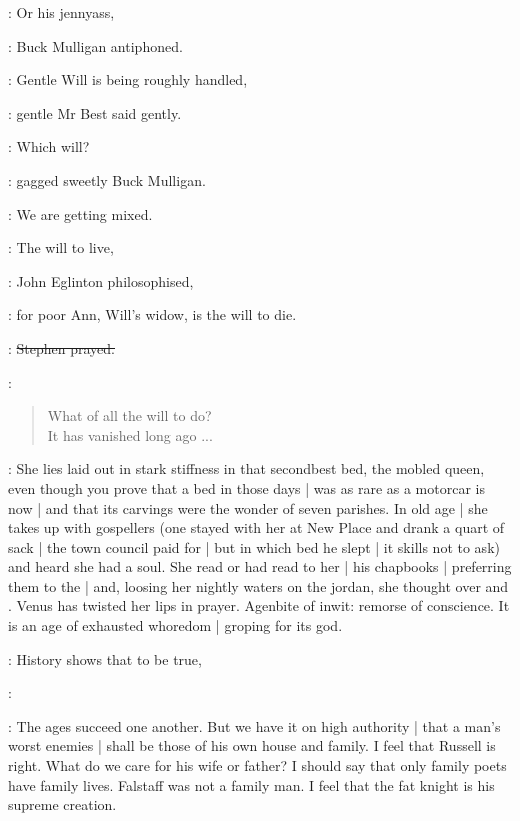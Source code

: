 \mulligan:
Or his jennyass,

:
Buck Mulligan antiphoned.

\best:
Gentle Will is being roughly handled,

:
gentle Mr Best said gently.

\mulligan:
Which will?

:
gagged sweetly Buck Mulligan.

\mulligan:
We are getting mixed.

\eglinton:
The will to live,

:
John Eglinton philosophised,

\eglinton:
for poor Ann,
Will's widow,
is the will to die.

\Stephen:
\sout{Stephen prayed.}

\Stephen:
\begin{verse}
    What of all the will to do? \\
    It has vanished long ago ...
\end{verse}

\Stephen:
She lies laid out in stark stiffness in that secondbest bed,
the mobled queen,
even though you prove that a bed in those days |
was as rare as a motorcar is now |
and that its carvings were the wonder of seven parishes.
In old age |
she takes up with gospellers
(one stayed with her at New Place
and drank a quart of sack |
the town council paid for |
but in which bed he slept |
it skills not to ask)
and heard she had a soul.
She read or had read to her |
his chapbooks |
preferring them to the  |
and, loosing her nightly waters on the jordan,
she thought over 
and .
Venus has twisted her lips in prayer.
Agenbite of inwit:
remorse of conscience.
It is an age of exhausted whoredom |
groping for its god.

\eglinton:
History shows that to be true,

:

\eglinton:
The ages succeed one another.
But we have it on high authority |
that a man's worst enemies |
shall be those of his own house and family.
I feel that Russell is right.
What do we care for his wife or father?
I should say that only family poets have family lives.
Falstaff was not a family man.
I feel that the fat knight is his supreme creation.


